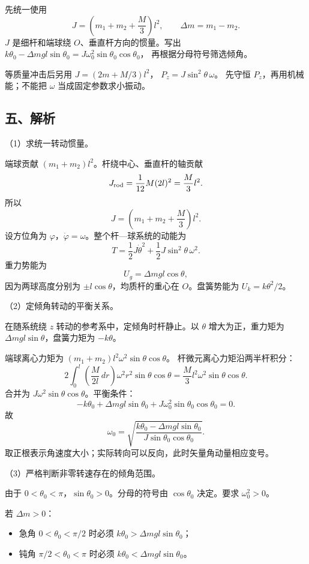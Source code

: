 \documentclass[12pt,a4paper,fontset=fandol]{ctexart}
\providecommand{\tightlist}{\setlength{\itemsep}{0pt}\setlength{\parskip}{0pt}}
\begin{document}
先统一使用 \[
J=\left(m_1+m_2+\frac M3\right)l^2,\qquad
\Delta m=m_1-m_2.
\] \(J\) 是细杆和端球绕 \(O\)、垂直杆方向的惯量。写出
\(k\theta_0-\Delta mgl\sin\theta_0
=J\omega_0^2\sin\theta_0\cos\theta_0\)， 再根据分母符号筛选倾角。

等质量冲击后另用 \(J=(2m+M/3)l^2\)， \(P_z=J\sin^2\theta\,\omega\)。
先守恒 \(P_z\)，再用机械能；不能把 \(\omega\) 当成固定参数求小振动。

\subsection{五、解析}\label{ux4e94ux89e3ux6790-5}

（1）求统一转动惯量。

端球贡献 \((m_1+m_2)l^2\)。杆绕中心、垂直杆的轴贡献 \[
J_{\rm rod}=\frac1{12}M(2l)^2=\frac M3l^2.
\] 所以 \[
\boxed{J=\left(m_1+m_2+\frac M3\right)l^2.}\tag{6.1}
\] 设方位角为
\(\varphi\)，\(\dot\varphi=\omega\)。整个杆---球系统的动能为 \[
T=\frac12J\dot\theta^2+\frac12J\sin^2\theta\,\omega^2.
\] 重力势能为 \[
U_g=\Delta mgl\cos\theta,
\] 因为两球高度分别为 \(\pm l\cos\theta\)，均质杆的重心在
\(O\)。盘簧势能为 \(U_k=k\theta^2/2\)。

（2）定倾角转动的平衡关系。

在随系统绕 \(z\) 转动的参考系中，定倾角时杆静止。以 \(\theta\)
增大为正，重力矩为 \(\Delta mgl\sin\theta\)，盘簧力矩为 \(-k\theta\)。

端球离心力矩为 \((m_1+m_2)l^2\omega^2\sin\theta\cos\theta\)。
杆微元离心力矩沿两半杆积分： \[
2\int_0^l
\left(\frac{M}{2l}\,dr\right)
\omega^2r^2\sin\theta\cos\theta
=\frac M3l^2\omega^2\sin\theta\cos\theta.
\] 合并为 \(J\omega^2\sin\theta\cos\theta\)。平衡条件： \[
-k\theta_0+\Delta mgl\sin\theta_0
+J\omega_0^2\sin\theta_0\cos\theta_0=0.
\] 故 \[
\boxed{\omega_0=
\sqrt{\frac{k\theta_0-\Delta mgl\sin\theta_0}
{J\sin\theta_0\cos\theta_0}}.}\tag{6.2}
\] 取正根表示角速度大小；实际转向可以反向，此时矢量角动量相应变号。

（3）严格判断非零转速存在的倾角范围。

由于 \(0<\theta_0<\pi\)，\(\sin\theta_0>0\)。分母的符号由
\(\cos\theta_0\) 决定。要求 \(\omega_0^2>0\)。

若 \(\Delta m>0\)：

\begin{itemize}
\tightlist
\item
  急角 \(0<\theta_0<\pi/2\) 时必须
  \(k\theta_0>\Delta mgl\sin\theta_0\)；
\item
  钝角 \(\pi/2<\theta_0<\pi\) 时必须
  \(k\theta_0<\Delta mgl\sin\theta_0\)。
\end{itemize}
\end{document}
